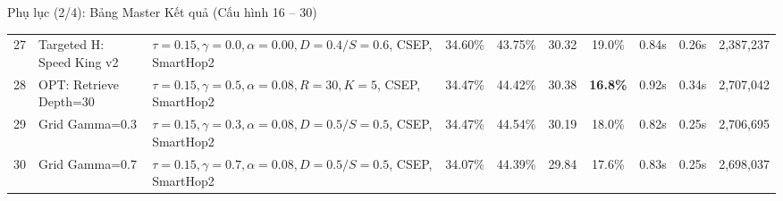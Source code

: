 \documentclass[aspectratio=169,10pt]{beamer}
\begin{document}
\begin{frame}{Phụ lục (2/4): Bảng Master Kết quả (Cấu hình 16 -- 30)}
{\begin{tabular}{c l l ccccccc}
27 & Targeted H: Speed King v2 & $\tau=0.15, \gamma=0.0, \alpha=0.00, D=0.4/S=0.6$, CSEP, SmartHop2 & 34.60\% & 43.75\% & 30.32 & 19.0\% & 0.84s & 0.26s & 2,387,237 \\
28 & OPT: Retrieve Depth=30 & $\tau=0.15, \gamma=0.5, \alpha=0.08, R=30, K=5$, CSEP, SmartHop2 & 34.47\% & 44.42\% & 30.38 & \textbf{16.8\%} & 0.92s & 0.34s & 2,707,042 \\
29 & Grid Gamma=0.3 & $\tau=0.15, \gamma=0.3, \alpha=0.08, D=0.5/S=0.5$, CSEP, SmartHop2 & 34.47\% & 44.54\% & 30.19 & 18.0\% & 0.82s & 0.25s & 2,706,695 \\
30 & Grid Gamma=0.7 & $\tau=0.15, \gamma=0.7, \alpha=0.08, D=0.5/S=0.5$, CSEP, SmartHop2 & 34.07\% & 44.39\% & 29.84 & 17.6\% & 0.83s & 0.25s & 2,698,037 \\
\bottomrule
\end{tabular}
}
\end{frame}
\end{document}
